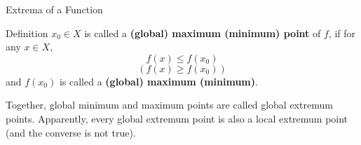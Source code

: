 \documentclass{beamer}
\begin{document}
\begin{frame}{Extrema of a Function}
     \begin{block}{Definition}
     \(x_0\in X\) is called a \textbf{(global) maximum (minimum) point} of \(f\), if for any \(x \in X\), 
     \[f(x) \leq f(x_0)\]
     \[(f(x) \geq f(x_0))\]
\pause and $f(x_0)$ is called a \textbf{(global) maximum (minimum)}.
\end{block}
\pause Together, global minimum and maximum points are called global extremum points.
\pause Apparently, every global extremum point is also a local extremum point (and the converse is not true).
\end{frame}

\end{document}
